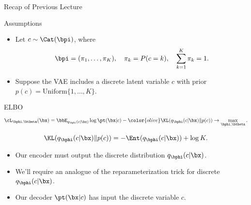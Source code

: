 \documentclass{beamer}
\begin{document}
\begin{frame}
	\titlepage
	\resetonslide
\end{frame}
\begin{frame}{Recap of Previous Lecture}
	\vspace{-0.3cm}
	\begin{block}{Assumptions}
		\begin{itemize}
			\item Let $c \sim \Cat(\bpi)$, where 
			\vspace{-0.6cm}
			\[
				\bpi = (\pi_1, \dots, \pi_K), \quad \pi_k = P(c = k), \quad \sum_{k=1}^K \pi_k = 1.
			\]
			\vspace{-0.7cm}
			\item Suppose the VAE includes a discrete latent variable $c$ with prior $p(c) = \text{Uniform}\{1, \dots, K\}$.
		\end{itemize}
	\end{block}
	\vspace{-0.3cm}
	\begin{block}{ELBO}
		\vspace{-0.6cm}
		\[
			\cL_{\bphi, \btheta}(\bx)  = \bbE_{q_{\bphi}(c| \bx)} \log \pt(\bx| c) - {\color{olive} \KL(q_{\bphi}(c| \bx) \| p(c))} \rightarrow \max_{\bphi, \btheta}.
		\]
	\end{block}
	\vspace{-1.0cm}
	\[
		\KL(q_{\bphi}(c| \bx) \| p(c)) = - \Ent(q_{\bphi}(c| \bx)) + \log K. 
	\]		
	\vspace{-0.5cm}
	\begin{itemize}
		\item Our encoder must output the discrete distribution $q_{\bphi}(c| \bx)$.
		\item We'll require an analogue of the reparameterization trick for discrete $q_{\bphi}(c| \bx)$.
		\item Our decoder $\pt(\bx| c)$ has input the discrete variable $c$.
	\end{itemize}
\end{frame}
\end{document}
